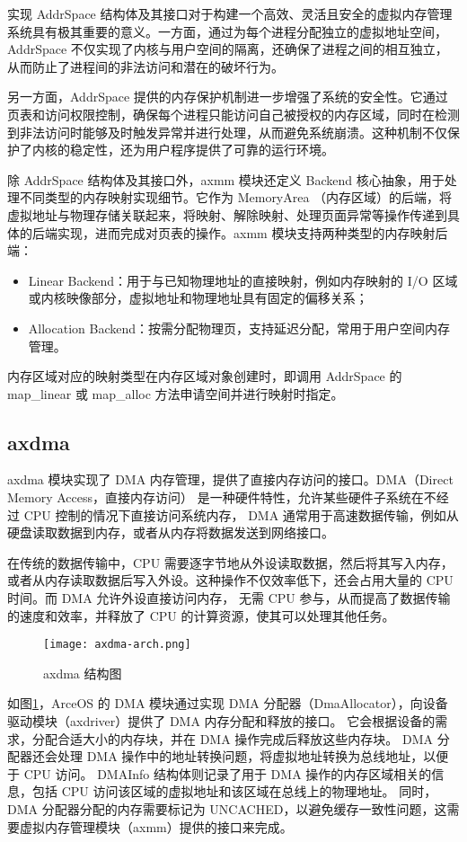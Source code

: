 实现 AddrSpace 结构体及其接口对于构建一个高效、灵活且安全的虚拟内存管理系统具有极其重要的意义。一方面，通过为每个进程分配独立的虚拟地址空间，AddrSpace 不仅实现了内核与用户空间的隔离，还确保了进程之间的相互独立，从而防止了进程间的非法访问和潜在的破坏行为。

另一方面，AddrSpace 提供的内存保护机制进一步增强了系统的安全性。它通过页表和访问权限控制，确保每个进程只能访问自己被授权的内存区域，同时在检测到非法访问时能够及时触发异常并进行处理，从而避免系统崩溃。这种机制不仅保护了内核的稳定性，还为用户程序提供了可靠的运行环境。

除 AddrSpace 结构体及其接口外，axmm 模块还定义 Backend 核心抽象，用于处理不同类型的内存映射实现细节。它作为 MemoryArea （内存区域）的后端，将虚拟地址与物理存储关联起来，将映射、解除映射、处理页面异常等操作传递到具体的后端实现，进而完成对页表的操作。axmm 模块支持两种类型的内存映射后端：
\begin{itemize}
\item Linear Backend：用于与已知物理地址的直接映射，例如内存映射的 I/O 区域或内核映像部分，虚拟地址和物理地址具有固定的偏移关系；
\item Allocation Backend：按需分配物理页，支持延迟分配，常用于用户空间内存管理。
\end{itemize}

内存区域对应的映射类型在内存区域对象创建时，即调用 AddrSpace 的 map\_linear 或 map\_alloc 方法申请空间并进行映射时指定。

\subsection{axdma}
axdma 模块实现了 DMA 内存管理，提供了直接内存访问的接口。DMA（Direct Memory Access，直接内存访问） 是一种硬件特性，允许某些硬件子系统在不经过 CPU 控制的情况下直接访问系统内存，
DMA 通常用于高速数据传输，例如从硬盘读取数据到内存，或者从内存将数据发送到网络接口。

在传统的数据传输中，CPU 需要逐字节地从外设读取数据，然后将其写入内存，或者从内存读取数据后写入外设。这种操作不仅效率低下，还会占用大量的 CPU 时间。而 DMA 允许外设直接访问内存，
无需 CPU 参与，从而提高了数据传输的速度和效率，并释放了 CPU 的计算资源，使其可以处理其他任务。

\begin{figure}[H]
    \centering
    \texttt{[image: axdma-arch.png]}
    \caption{axdma 结构图}
    \label{fig:axdma-arch}
\end{figure}

如图\ref{fig:axdma-arch}，ArceOS 的 DMA 模块通过实现 DMA 分配器（DmaAllocator），向设备驱动模块（axdriver）提供了 DMA 内存分配和释放的接口。
它会根据设备的需求，分配合适大小的内存块，并在 DMA 操作完成后释放这些内存块。
DMA 分配器还会处理 DMA 操作中的地址转换问题，将虚拟地址转换为总线地址，以便于 CPU 访问。
DMAInfo 结构体则记录了用于 DMA 操作的内存区域相关的信息，包括 CPU 访问该区域的虚拟地址和该区域在总线上的物理地址。
同时，DMA 分配器分配的内存需要标记为 UNCACHED，以避免缓存一致性问题，这需要虚拟内存管理模块（axmm）提供的接口来完成。

